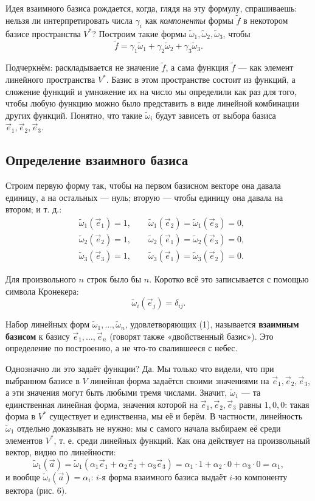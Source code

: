 \documentclass[11pt,a4paper]{article}
\begin{document}
Идея взаимного базиса рождается, когда, глядя на эту формулу, спрашиваешь: нельзя ли интерпретировать числа $\gamma_i$ как \emph{компоненты} формы $\tilde f$ в некотором базисе пространства $V^*$? Построим такие формы $\tilde\omega_1, \tilde\omega_2, \tilde\omega_3$, чтобы
\[
\tilde f = \gamma_1 \tilde\omega_1 + \gamma_2 \tilde\omega_2 + \gamma_3 \tilde\omega_3.
\]

Подчеркнём: раскладывается не значение $\tilde f$, а сама функция $\tilde f$ — как элемент линейного пространства $V^*$. Базис в этом пространстве состоит из функций, а сложение функций и умножение их на число мы определили как раз для того, чтобы любую функцию можно было представить в виде линейной комбинации других функций. Понятно, что такие $\tilde\omega_i$ будут зависеть от выбора базиса $\vec e_1, \vec e_2, \vec e_3$.

\subsection{Определение взаимного базиса}

Строим первую форму так, чтобы на первом базисном векторе она давала единицу, а на остальных — нуль; вторую — чтобы единицу она давала на втором; и т. д.:
\[
\begin{aligned}
&\tilde\omega_1(\vec e_1) = 1, \qquad \tilde\omega_1(\vec e_2) = \tilde\omega_1(\vec e_3) = 0, \\
&\tilde\omega_2(\vec e_2) = 1, \qquad \tilde\omega_2(\vec e_1) = \tilde\omega_2(\vec e_3) = 0, \\
&\tilde\omega_3(\vec e_3) = 1, \qquad \tilde\omega_3(\vec e_1) = \tilde\omega_3(\vec e_2) = 0.
\end{aligned}
\]

Для произвольного $n$ строк было бы $n$. Коротко всё это записывается с помощью символа Кронекера:
\[
\tilde\omega_i(\vec e_j) = \delta_{ij}. \tag{1}
\]

Набор линейных форм $\tilde\omega_1, \dots, \tilde\omega_n$, удовлетворяющих (1), называется \textbf{взаимным базисом} к базису $\vec e_1, \dots, \vec e_n$ (говорят также «двойственный базис»). Это определение по построению, а не что-то свалившееся с небес.

Однозначно ли это задаёт функции? Да. Мы только что видели, что при выбранном базисе в $V$ линейная форма задаётся своими значениями на $\vec e_1, \vec e_2, \vec e_3$, а эти значения могут быть любыми тремя числами. Значит, $\tilde\omega_1$ — та единственная линейная форма, значения которой на $\vec e_1, \vec e_2, \vec e_3$ равны $1, 0, 0$: такая форма в $V^*$ существует и единственна, мы её и берём. В частности, линейность $\tilde\omega_1$ отдельно доказывать не нужно: мы с самого начала выбираем её среди элементов $V^*$, т. е. среди линейных функций. Как она действует на произвольный вектор, видно по линейности:
\[
\tilde\omega_1(\vec a) = \tilde\omega_1(\alpha_1 \vec e_1 + \alpha_2 \vec e_2 + \alpha_3 \vec e_3) = \alpha_1 \cdot 1 + \alpha_2 \cdot 0 + \alpha_3 \cdot 0 = \alpha_1,
\]
и вообще $\tilde\omega_i(\vec a) = \alpha_i$: $i$-я форма взаимного базиса выдаёт $i$-ю компоненту вектора (рис. 6).
\end{document}
